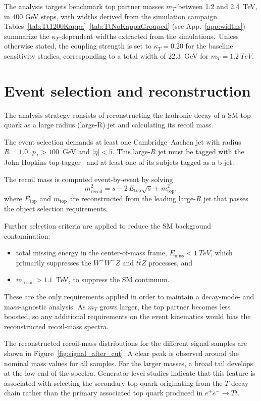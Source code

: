 \documentclass[a4paper,11pt]{article}
\begin{document}
The analysis targets benchmark top partner masses $m_{T}$ between 1.2 and 2.4~TeV, in 400 GeV steps, with widths derived from the simulation campaign. Tables~\ref{tab:Tt1200Kappa}--\ref{tab:TtNoKappaGrouped} (see App.~\ref{app:widths}) summarize the $\kappa_{T}$-dependent widths extracted from the simulations.~Unless otherwise stated, the coupling strength is set to $\kappa_{T}=0.20$ for the baseline sensitivity studies, corresponding to a total width of \SI{22.3}{GeV} for $m_{T} = \SI{1.2}{TeV}$.


\section{Event selection and reconstruction}

The analysis strategy consists of reconstructing the hadronic decay of a SM top quark as a large radius (large-R) jet and calculating its recoil mass. 

The event selection demands at least one Cambridge--Aachen jet with radius $R=1.0$, $p_{T} > 100$~GeV and $|\eta|<5$. This large-$R$ jet must be tagged with the John Hopkins top-tagger~\cite{Kaplan:2008} and at least one of its subjets tagged as a b-jet.  

The recoil mass is computed event-by-event by solving
\begin{equation}
  m_{\text{recoil}}^{2} = s - 2\,E_{\text{top}}\sqrt{s} + m_{\text{top}}^{2},
  \label{eq:recoilMass}
\end{equation}
where $E_{\text{top}}$ and $m_{\text{top}}$ are reconstructed from the leading large-$R$ jet that passes the object selection requirements.  

Further selection criteria are applied to reduce the SM background contamination:
\begin{itemize}
  \item total missing energy in the center-of-mass frame, $E_{\text{miss}} < \SI{1}{TeV}$, which primarily suppresses the $W^{+}W^{-}Z$ and $t\bar{t}Z$ processes, and
  \item $m_{\text{recoil}} > 1.1$~TeV, to suppress the SM continuum.
\end{itemize}

These are the only requirements applied in order to maintain a decay-mode- and mass-agnostic analysis. As $m_{T}$ grows larger, the top partner becomes less boosted, so any additional requirements on the event kinematics would bias the reconstructed recoil-mass spectra.

The reconstructed recoil-mass distributions for the different signal samples are shown in Figure~\ref{fig:signal_after_cut}. A clear peak is observed around the nominal mass values for all samples. For the larger masses, a broad tail develops at the low end of the spectra. Generator-level studies indicate that this feature is associated with selecting the secondary top quark originating from the $T$ decay chain rather than the primary associated top quark produced in $e^{+}e^{-}\to Tt$.
\end{document}
